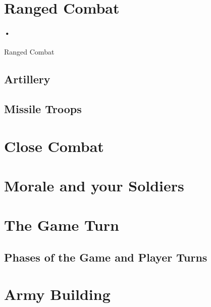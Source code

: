 \documentclass{article}
\begin{document}
\section{Ranged Combat}
\paragraph{•}
Ranged Combat 
\subsection{Artillery}
\subsection{Missile Troops}
\section{Close Combat}
\section{Morale and your Soldiers}
\section{The Game Turn}
\subsection{Phases of the Game and Player Turns}
\section{Army Building}
\end{document}

